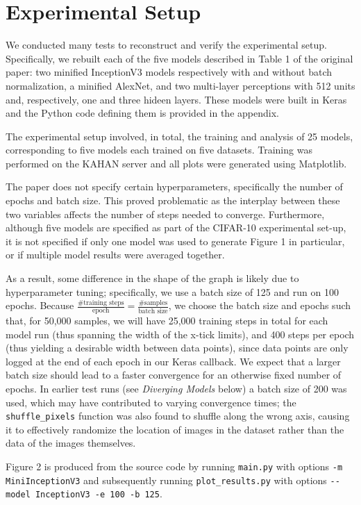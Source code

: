 \documentclass[12pt]{article}
\begin{document}
\section{Experimental Setup}

We conducted many tests to reconstruct and verify the experimental setup. Specifically, we rebuilt each of the five models described in Table 1 of the original paper: two minified InceptionV3 models respectively with and without batch normalization, a minified AlexNet, and two multi-layer perceptions with 512 units and, respectively, one and three hideen layers. These models were built in Keras and the Python code defining them is provided in the appendix.

The experimental setup involved, in total, the training and analysis of 25 models, corresponding to five models each trained on five datasets. Training was performed on the KAHAN server and all plots were generated using Matplotlib.

The paper does not specify certain hyperparameters, specifically the number of epochs and batch size. This proved problematic as the interplay between these two variables affects the number of steps needed to converge. Furthermore, although five models are specified as part of the CIFAR-10 experimental set-up, it is not specified if only one model was used to generate Figure 1 in particular, or if multiple model results were averaged together.

As a result, some difference in the shape of the graph is likely due to hyperparameter tuning; specifically, we use a batch size of 125 and run on 100 epochs. Because $\frac{\text{\# training steps}}{\text{epoch}} = \frac{\text{\# samples}}{\text{batch size}}$, we choose the batch size and epochs such that, for 50,000 samples, we will have 25,000 training steps in total for each model run (thus spanning the width of the x-tick limits), and 400 steps per epoch (thus yielding a desirable width between data points), since data points are only logged at the end of each epoch in our Keras callback. We expect that a larger batch size should lead to a faster convergence for an otherwise fixed number of epochs. In earlier test runs (see \textit{Diverging Models} below) a batch size of 200 was used, which may have contributed to varying convergence times; the \verb|shuffle_pixels| function was also found to shuffle along the wrong axis, causing it to effectively randomize the location of images in the dataset rather than the data of the images themselves.

Figure 2 is produced from the source code by running \verb|main.py| with options
 \verb|-m MiniInceptionV3| and subsequently running \verb|plot_results.py| with options
  \verb|--model InceptionV3 -e 100 -b 125|.
\end{document}
